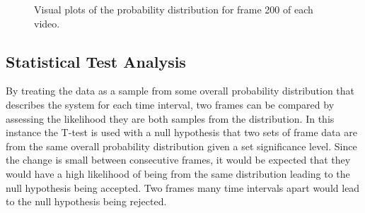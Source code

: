 \vspace{2cm}


\begin{figure}[H]
     

    \center
  
     \caption{Visual plots of the probability distribution for frame 200 of each video.}
     
     \label{fig:probd}
\end{figure}



\subsection{Statistical Test Analysis}
By treating the data as a sample from some overall probability distribution that describes the system for each time interval, two frames can be compared by assessing the likelihood they are both samples from the distribution. In this instance the T-test is used with a null hypothesis that two sets of frame data are from the same overall probability distribution given a set significance level. Since the change is small between consecutive frames, it would be expected that they would have a high likelihood of being from the same distribution leading to the null hypothesis being accepted. Two frames many time intervals apart would lead to the null hypothesis being rejected. 

